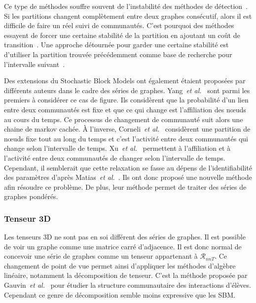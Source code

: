 Ce type de méthodes souffre souvent de l'instabilité des méthodes de détection~\cite{Aynaud2010,Harenberg2014a}.
Si les partitions changent complètement entre deux graphes consécutif, alors il est difficile de faire un réel suivi de communautés.
C'est pourquoi des méthodes essayent de forcer une certaine stabilité de la partition en ajoutant un coût de transition~\cite{Chakrabarti2006,Chen2013,Kalavathi2015}.
Une approche détournée pour garder une certaine stabilité est d'utiliser la partition trouvée précédemment comme base de recherche pour l'intervalle suivant~\cite{Lancichinetti2011a}.

Des extensions du Stochastic Block Models ont également étaient proposées par différents auteurs dans le cadre des séries de graphes.
Yang~\emph{et al.}~\cite{Yang2011} sont parmi les premiers à considérer ce cas de figure.
Ils considèrent que la probabilité d'un lien entre deux communautés est fixe et que ce qui change est l'affiliation des n\oe uds au cours du temps.
Ce processus de changement de communauté suit alors une chaine de markov cachée.
\`A l'inverse, Corneli~\emph{et al.}~\cite{Corneli2016} considèrent une partition de n\oe uds fixe tout au long du temps et c'est l'activité entre deux communautés qui change selon l'intervalle de temps.
Xu~\emph{et al.}~\cite{Xu2014} permettent à l'affiliation et à l'activité entre deux communautés de changer selon l'intervalle de temps.
Cependant, il semblerait que cette relaxation se fasse au dépens de l'identifiabilité des paramètres d'après Matias~\emph{et al.}~\cite{Matias2015}.
Ils ont donc proposé une nouvelle méthode afin résoudre ce problème.
De plus, leur méthode permet de traiter des séries de graphes pondérés.

\subsubsection{Tenseur 3D}
Les tenseurs 3D ne sont pas en soi différent des séries de graphes.
Il est possible de voir un graphe comme une matrice carré d'adjacence.
Il est donc normal de concevoir une série de graphes comme un tenseur appartenant à $\mathcal{R}_{nnT}$.
Ce changement de point de vue permet ainsi d'appliquer les méthodes d'algèbre linéaire, notamment la décomposition de tenseur.
C'est la méthode proposée par Gauvin~\emph{et al.}~\cite{Gauvin2014} pour étudier la structure communautaire des interactions d'élèves.
Cependant ce genre de décomposition semble moins expressive que les SBM.


